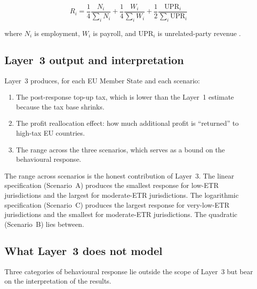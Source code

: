 \documentclass[11pt,a4paper]{article}
\begin{document}
\begin{equation}\label{eq:reallocation}
R_i = \frac{1}{4}\frac{N_i}{\sum_i N_i} + \frac{1}{4}\frac{W_i}{\sum_i W_i} + \frac{1}{2}\frac{\text{UPR}_i}{\sum_i \text{UPR}_i}
\end{equation}

where $N_i$ is employment, $W_i$ is payroll, and $\text{UPR}_i$ is unrelated-party revenue \citep{garcia2024}.

\subsection{Layer~3 output and interpretation}

Layer~3 produces, for each EU Member State and each scenario:
\begin{enumerate}
\item The post-response top-up tax, which is lower than the Layer~1 estimate because the tax base shrinks.
\item The profit reallocation effect: how much additional profit is ``returned'' to high-tax EU countries.
\item The range across the three scenarios, which serves as a bound on the behavioural response.
\end{enumerate}

The range across scenarios is the honest contribution of Layer~3. The linear specification (Scenario~A) produces the smallest response for low-ETR jurisdictions and the largest for moderate-ETR jurisdictions. The logarithmic specification (Scenario~C) produces the largest response for very-low-ETR jurisdictions and the smallest for moderate-ETR jurisdictions. The quadratic (Scenario~B) lies between.

\subsection{What Layer~3 does not model}\label{sec:layer3_limits}

Three categories of behavioural response lie outside the scope of Layer~3 but bear on the interpretation of the results.
\end{document}
